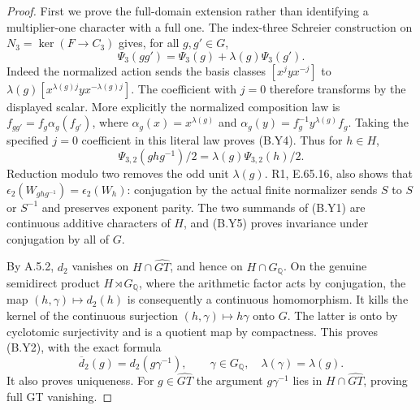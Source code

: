 \begin{proof}
First we prove the full-domain extension rather than
identifying a multiplier-one character with a full one.
The index-three Schreier construction on
$N_3=\ker(F\to C_3)$ gives, for all $g,g'\in G$,
\[
 \Psi_3(gg')=\Psi_3(g)+\lambda(g)\Psi_3(g').
 \tag{B.Y4}
\]
Indeed the normalized action sends the basis classes
$[x^jyx^{-j}]$ to
$\lambda(g)[x^{\lambda(g)j}yx^{-\lambda(g)j}]$.
The coefficient with $j=0$ therefore transforms by
the displayed scalar.  More explicitly the normalized
composition law is
$f_{gg'}=f_g\alpha_g(f_{g'})$, where
$\alpha_g(x)=x^{\lambda(g)}$ and
$\alpha_g(y)=f_g^{-1}y^{\lambda(g)}f_g$.
Taking the specified $j=0$ coefficient in this literal
law proves (B.Y4).  Thus for $h\in H$,
\[
 \Psi_{3,2}(ghg^{-1})/2
                  =\lambda(g)\Psi_{3,2}(h)/2.
 \tag{B.Y5}
\]
Reduction modulo two removes the odd unit $\lambda(g)$.
R1, E.65.16, also shows that
$\epsilon_2(W_{ghg^{-1}})=\epsilon_2(W_h)$: conjugation
by the actual finite normalizer sends $S$ to $S$ or
$S^{-1}$ and preserves exponent parity.  The two summands
of (B.Y1) are continuous additive characters of $H$,
and (B.Y5) proves invariance under conjugation by all
of $G$.

By A.5.2, $d_2$ vanishes on $H\cap\widehat{GT}$,
and hence on $H\cap G_{\mathbb Q}$.  On the genuine
semidirect product $H\rtimes G_{\mathbb Q}$, where the
arithmetic factor acts by conjugation, the map
$(h,\gamma)\mapsto d_2(h)$ is consequently a continuous
homomorphism.  It kills the kernel of the continuous
surjection $(h,\gamma)\mapsto h\gamma$ onto $G$.
The latter is onto by cyclotomic surjectivity and is a
quotient map by compactness.  This proves (B.Y2), with
the exact formula
\[
 \overline d_2(g)=d_2(g\gamma^{-1}),
       \qquad\gamma\in G_{\mathbb Q},\quad
                         \lambda(\gamma)=\lambda(g).
 \tag{B.Y6}
\]
It also proves uniqueness.  For $g\in\widehat{GT}$
the argument $g\gamma^{-1}$ lies in
$H\cap\widehat{GT}$, proving full GT vanishing.


\end{proof}

